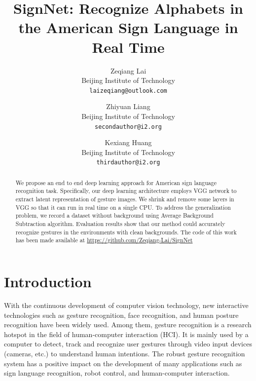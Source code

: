 \documentclass[10pt,twocolumn,letterpaper]{article}
\begin{document}
\title{SignNet: Recognize Alphabets in the American Sign Language in Real Time}

\author{
Zeqiang Lai\\
Beijing Institute of Technology\\
{\tt\small laizeqiang@outlook.com}
\and
Zhiyuan Liang\\
Beijing Institute of Technology\\
{\tt\small secondauthor@i2.org}
\and
Kexiang Huang\\
Beijing Institute of Technology\\
{\tt\small thirdauthor@i2.org}
}

\maketitle

\begin{abstract}
   We propose an end to end deep learning approach for American sign language recognition task. Specifically, our deep learning architecture employs VGG network to extract latent representation of gesture images. We shrink and remove some layers in VGG so that it can run in real time on a single CPU. To address the generalization problem, we record a dataset without background using Average Background Subtraction algorithm. Evaluation results show that our method could accurately recognize gestures in the environments with clean backgrounds.
   The code of this work has been made available at \url{https://github.com/Zeqiang-Lai/SignNet}
\end{abstract}

\section{Introduction}

With the continuous development of computer vision technology, new interactive technologies such as gesture recognition, face recognition, and human posture recognition have been widely used. Among them, gesture recognition is a research hotspot in the field of human-computer interaction (HCI). It is mainly used by a computer to detect, track and recognize user gestures through video input devices (cameras, etc.) to understand human intentions. The robust gesture recognition system has a positive impact on the development of many applications such as sign language recognition, robot control, and human-computer interaction.
\end{document}
